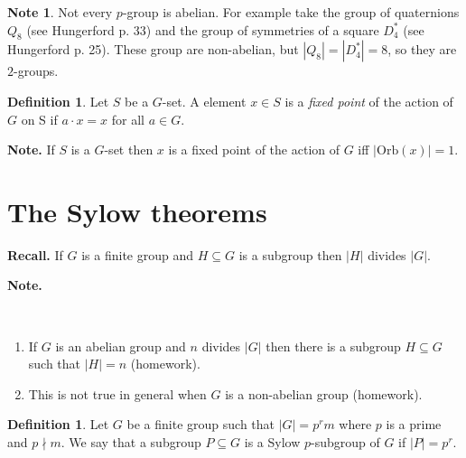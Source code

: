 \documentclass[12pt, letterpaper, oneside]{article}
\theoremstyle{plain}
\theoremstyle{definition}
\newtheorem{definition}[theorem]{Definition}
\newtheorem{note}[theorem]{Note}
\newcommand{\Orb}{\mathrm{Orb}}
\newcommand{\benu}{\begin{enumerate}}
\newcommand{\eenu}{\end{enumerate}}
\newcommand{\vs}{\vskip 5mm}
\newcommand{\isep}[1][0]{\setlength{\itemsep}{#1 mm}}
\begin{document}
\vs

\begin{note}
Not every $p$-group is abelian. For example take the group of quaternions 
$Q_{8}$ (see Hungerford p. 33) and the group of symmetries of a square $D^{\ast}_{4}$
(see Hungerford p. 25). These group are non-abelian, but $|Q_{8}| = |D^{\ast}_{4}| = 8$, 
so they are $2$-groups. 
\end{note}

\vs

\begin{definition}
Let $S$ be a $G$-set. A element $x\in S$ is a \emph{fixed point} of the action of $G$ on S
if $a\cdot x = x$ for all $a\in G$.
\end{definition}

\textbf{Note.} If $S$ is a $G$-set then $x$ is a fixed point of the action of $G$ iff $|\Orb(x)| = 1$. 










\newpage
\section{The Sylow theorems}
\label{SEC_SYLOWTHMS}

\textbf{Recall.} If $G$ is a finite group and $H\subseteq G$ is a subgroup then 
$|H|$ divides $|G|$. 

\textbf{Note.} 

\vskip -13mm

\ 
\benu
\isep 
\item If $G$ is an abelian group and $n$ divides $|G|$ then there is a subgroup 
$H\subseteq G$ such that $|H| = n$ (homework).

\item This is not true in general when $G$ is a non-abelian group (homework). 

\eenu


\vs\vs

\begin{definition}
Let $G$ be a finite group such that $|G| = p^{r}m$ where $p$ is a prime and $p\nmid m$. 
We say that a subgroup $P\subseteq G$ is a Sylow $p$-subgroup of $G$ if $|P|=p^{r}$.
\end{definition}

\vs\vs
\end{document}
